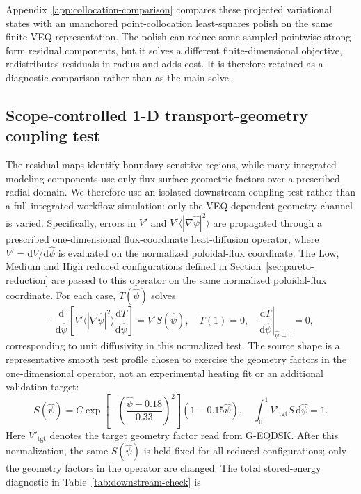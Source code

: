 \documentclass[final, 3p, times]{elsarticle}
\begin{document}
Appendix~\ref{app:collocation-comparison} compares these projected variational states with an unanchored point-collocation least-squares polish on the same finite VEQ representation. The polish can reduce some sampled pointwise strong-form residual components, but it solves a different finite-dimensional objective, redistributes residuals in radius and adds cost. It is therefore retained as a diagnostic comparison rather than as the main solve.

\subsection{Scope-controlled 1-D transport-geometry coupling test}
\label{sec:downstream-coupling}

The residual maps identify boundary-sensitive regions, while many integrated-modeling components use only flux-surface geometric factors over a prescribed radial domain. We therefore use an isolated downstream coupling test rather than a full integrated-workflow simulation: only the VEQ-dependent geometry channel is varied. Specifically, errors in $V'$ and $V'\langle|\nabla\hat{\psi}|^2\rangle$ are propagated through a prescribed one-dimensional flux-coordinate heat-diffusion operator, where $V'=\mathrm{d}V/\mathrm{d}\hat{\psi}$ is evaluated on the normalized poloidal-flux coordinate. The Low, Medium and High reduced configurations defined in Section~\ref{sec:pareto-reduction} are passed to this operator on the same normalized poloidal-flux coordinate. For each case, $T(\hat{\psi})$ solves
\begin{equation}
    -\frac{\mathrm{d}}{\mathrm{d}\hat{\psi}}
    \left[
        V'\langle|\nabla\hat{\psi}|^2\rangle
        \frac{\mathrm{d}T}{\mathrm{d}\hat{\psi}}
        \right]
    = V'S(\hat{\psi}),\quad T(1)=0,\quad
    \left.\frac{\mathrm{d}T}{\mathrm{d}\hat{\psi}}\right|_{\hat{\psi}=0}
    =0,
\end{equation}
corresponding to unit diffusivity in this normalized test. The source shape is a representative smooth test profile chosen to exercise the geometry factors in the one-dimensional operator, not an experimental heating fit or an additional validation target:
\begin{equation*}
    S(\hat{\psi})=C
    \exp\left[-\left(\frac{\hat{\psi}-0.18}{0.33}\right)^2\right]
    \left(1-0.15\hat{\psi}\right),\quad \int_0^1 V'_{\mathrm{tgt}}S\,\mathrm{d}\hat{\psi}=1.
\end{equation*}
Here $V'_{\mathrm{tgt}}$ denotes the target geometry factor read from G-EQDSK. After this normalization, the same $S(\hat{\psi})$ is held fixed for all reduced configurations; only the geometry factors in the operator are changed. The total stored-energy diagnostic in Table~\ref{tab:downstream-check} is
\end{document}
